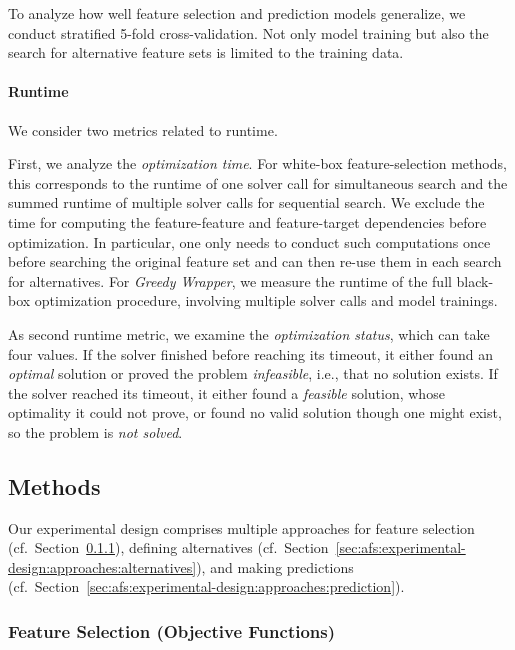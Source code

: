 \documentclass{article}
\theoremstyle{definition}
\begin{document}
To analyze how well feature selection and prediction models generalize, we conduct stratified 5-fold cross-validation.
Not only model training but also the search for alternative feature sets is limited to the training data.

\paragraph{Runtime}

We consider two metrics related to runtime.

First, we analyze the \emph{optimization time}.
For white-box feature-selection methods, this corresponds to the runtime of one solver call for simultaneous search and the summed runtime of multiple solver calls for sequential search.
We exclude the time for computing the feature-feature and feature-target dependencies before optimization.
In particular, one only needs to conduct such computations once before searching the original feature set and can then re-use them in each search for alternatives.
For \emph{Greedy Wrapper}, we measure the runtime of the full black-box optimization procedure, involving multiple solver calls and model trainings.

As second runtime metric, we examine the \emph{optimization status}, which can take four values.
If the solver finished before reaching its timeout, it either found an \emph{optimal} solution or proved the problem \emph{infeasible}, i.e., that no solution exists.
If the solver reached its timeout, it either found a \emph{feasible} solution, whose optimality it could not prove, or found no valid solution though one might exist, so the problem is \emph{not solved}.

\subsection{Methods}
\label{sec:afs:experimental-design:approaches}

Our experimental design comprises multiple approaches for feature selection (cf.~Section~\ref{sec:afs:experimental-design:approaches:feature-selection}), defining alternatives (cf.~Section~\ref{sec:afs:experimental-design:approaches:alternatives}), and making predictions (cf.~Section~\ref{sec:afs:experimental-design:approaches:prediction}).

\subsubsection{Feature Selection (Objective Functions)}
\label{sec:afs:experimental-design:approaches:feature-selection}
\end{document}
